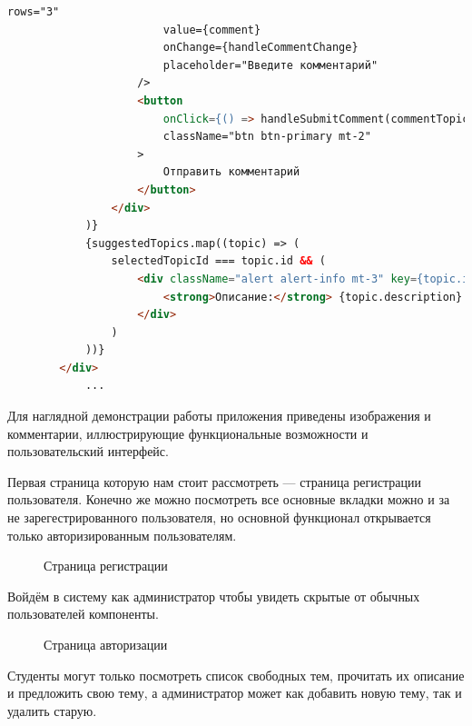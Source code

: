 \documentclass[14pt]{extarticle} %
\begin{document}
\begin{lstlisting}[language=html, caption={TopicFreeList.jsx}, label={lst:topicFreeList}]
                        rows="3"
                        value={comment}
                        onChange={handleCommentChange}
                        placeholder="Введите комментарий"
                    />
                    <button
                        onClick={() => handleSubmitComment(commentTopicId)}
                        className="btn btn-primary mt-2"
                    >
                        Отправить комментарий
                    </button>
                </div>
            )}
            {suggestedTopics.map((topic) => (
                selectedTopicId === topic.id && (
                    <div className="alert alert-info mt-3" key={topic.id}>
                        <strong>Описание:</strong> {topic.description}
                    </div>
                )
            ))}
        </div>
            ...
\end{lstlisting}


Для наглядной демонстрации работы приложения приведены изображения и комментарии, иллюстрирующие функциональные возможности и пользовательский интерфейс.

Первая страница которую нам стоит рассмотреть --- страница регистрации пользователя. Конечно же можно посмотреть все основные вкладки можно и за не зарегестрированного пользователя, но основной функционал открывается только авторизированным пользователям. 

\begin{figure}[h]
	\centering	{}
	\caption{Страница регистрации}
	\label{ris1}
\end{figure}
\newpage
Войдём в систему как администратор чтобы увидеть скрытые от обычных пользователей компоненты. 

\begin{figure}[h]
	\centering	{}
	\caption{Страница авторизации}
	\label{ris1}
\end{figure}
Студенты могут только посмотреть список свободных тем, прочитать их описание и предложить свою тему, а администратор может как добавить новую тему, так и удалить старую.
\end{document}
